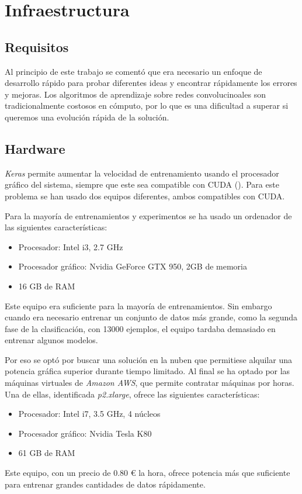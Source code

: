 
\chapter{Infraestructura} 
\label{ap:hardware}

\section{Requisitos}

Al principio de este trabajo se comentó que era necesario un enfoque de desarrollo rápido para probar diferentes ideas y encontrar rápidamente los errores y mejoras. Los algoritmos de aprendizaje sobre redes convolucinoales son tradicionalmente costosos en cómputo, por lo que es una dificultad a superar si queremos una evolución rápida de la solución.

\section{Hardware}

\textit{Keras} permite aumentar la velocidad de entrenamiento usando el procesador gráfico del sistema, siempre que este sea compatible con CUDA (). Para este problema se han usado dos equipos diferentes, ambos compatibles con CUDA.

Para la mayoría de entrenamientos y experimentos se ha usado un ordenador de las siguientes características:

\begin{itemize}
    \item{Procesador: Intel i3, 2.7 GHz}
    \item{Procesador gráfico: Nvidia GeForce GTX 950, 2GB de memoria}
    \item{16 GB de RAM}
\end{itemize}

Este equipo era suficiente para la mayoría de entrenamientos. Sin embargo cuando era necesario entrenar un conjunto de datos más grande, como la segunda fase de la clasificación, con 13000 ejemplos, el equipo tardaba demasiado en entrenar algunos modelos.

Por eso se optó por buscar una solución en la nuben que permitiese alquilar una potencia gráfica superior durante tiempo limitado. Al final se ha optado por las máquinas virtuales de \textit{Amazon AWS}, que permite contratar máquinas por horas. Una de ellas, identificada \textit{p2.xlarge}, ofrece las siguientes características:

\begin{itemize}
    \item{Procesador: Intel i7, 3.5 GHz, 4 núcleos}
    \item{Procesador gráfico: Nvidia Tesla K80}
    \item{61 GB de RAM}
\end{itemize}

Este equipo, con un precio de 0.80 € la hora, ofrece potencia más que suficiente para entrenar grandes cantidades de datos rápidamente.


